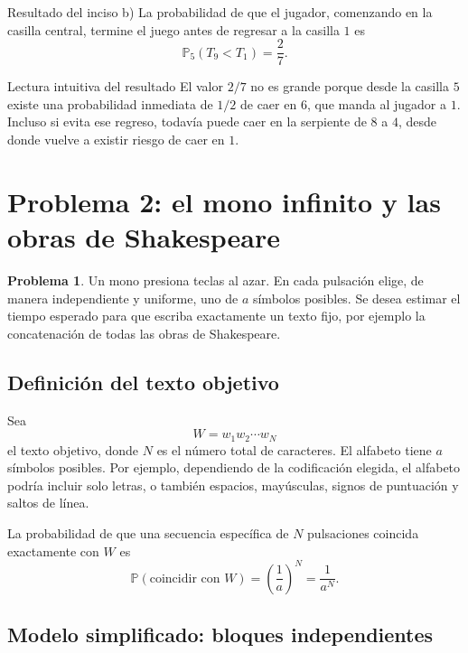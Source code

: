 \documentclass[12pt,a4paper]{article}
\newcommand{\Prob}{\mathbb{P}}
\theoremstyle{definition}
\newtheorem{problema}{Problema}
\begin{document}
\begin{cajaResultado}{Resultado del inciso b)}
La probabilidad de que el jugador, comenzando en la casilla central, termine el juego antes de regresar a la casilla \(1\) es
\[
    \boxed{\Prob_5(T_9<T_1)=\frac27.}
\]
\end{cajaResultado}

\begin{cajaIdea}{Lectura intuitiva del resultado}
El valor \(2/7\) no es grande porque desde la casilla \(5\) existe una probabilidad inmediata de \(1/2\) de caer en \(6\), que manda al jugador a \(1\). Incluso si evita ese regreso, todavía puede caer en la serpiente de \(8\) a \(4\), desde donde vuelve a existir riesgo de caer en \(1\).
\end{cajaIdea}

\section{Problema 2: el mono infinito y las obras de Shakespeare}

\begin{problema}
Un mono presiona teclas al azar. En cada pulsación elige, de manera independiente y uniforme, uno de \(a\) símbolos posibles. Se desea estimar el tiempo esperado para que escriba exactamente un texto fijo, por ejemplo la concatenación de todas las obras de Shakespeare.
\end{problema}

\subsection{Definición del texto objetivo}

Sea
\[
    W=w_1w_2\cdots w_N
\]
el texto objetivo, donde \(N\) es el número total de caracteres. El alfabeto tiene \(a\) símbolos posibles. Por ejemplo, dependiendo de la codificación elegida, el alfabeto podría incluir solo letras, o también espacios, mayúsculas, signos de puntuación y saltos de línea.

La probabilidad de que una secuencia específica de \(N\) pulsaciones coincida exactamente con \(W\) es
\[
    \Prob(\text{coincidir con }W)=\left(\frac1a\right)^N=\frac{1}{a^N}.
\]

\subsection{Modelo simplificado: bloques independientes}
\end{document}
